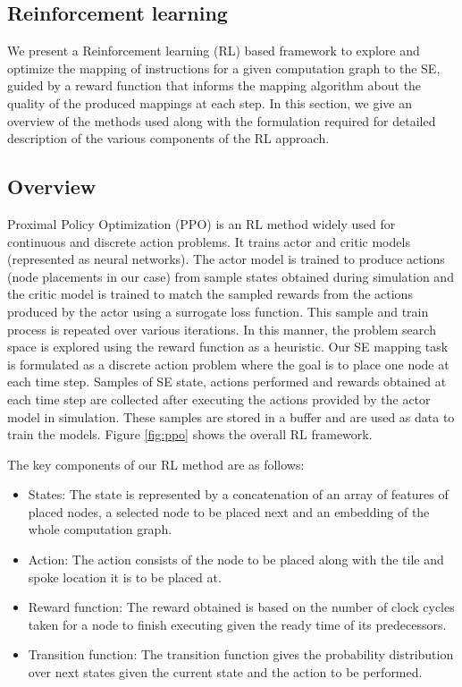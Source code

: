 \subsection{Reinforcement learning}

We present a Reinforcement learning (RL) based framework to explore and optimize the mapping of instructions for a given computation graph to the SE, guided by a reward function that informs the mapping algorithm about the quality of the produced mappings at each step. In this section, we give an overview of the methods used along with the formulation required for detailed description of the various components of the RL approach.

\subsection{Overview}
Proximal Policy Optimization (PPO) is an RL method widely used for continuous and discrete action problems. It trains actor and critic models (represented as neural networks).
The actor model is trained to produce actions (node placements in our case) from sample states obtained during simulation and the critic model is trained to match the sampled rewards from the actions produced by the actor using a surrogate loss function. This sample and train process is repeated over various iterations. In this manner, the problem search space is explored using the reward function as a heuristic.
Our SE mapping task is formulated as a discrete action problem where the goal is to place one node at each time step. Samples of SE state, actions performed and rewards obtained at each time step are collected after executing the actions provided by the actor model in simulation. These samples are stored in a buffer and are used as data to train the models.
Figure \ref{fig:ppo} shows the overall RL framework. 

The key components of our RL method are as follows:
\begin{itemize}
  \item States: The state is represented by a concatenation of an array of features of placed nodes, a selected node to be placed next and an embedding of the whole computation graph. 
  \item Action: The action consists of the node to be placed along with the tile and spoke location it is to be placed at.
  \item Reward function: The reward obtained is based on the number of clock cycles taken for a node to finish executing given the ready time of its predecessors.
  \item Transition function: The transition function gives the probability distribution over next states given the current state and the action to be performed.
\end{itemize}



